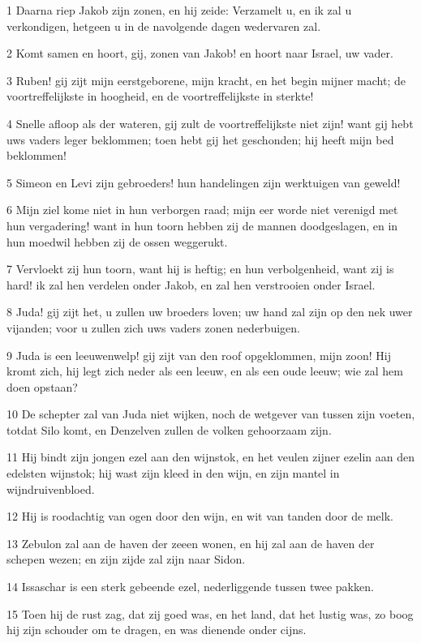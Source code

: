 \par 1 Daarna riep Jakob zijn zonen, en hij zeide: Verzamelt u, en ik zal u verkondigen, hetgeen u in de navolgende dagen wedervaren zal.
\par 2 Komt samen en hoort, gij, zonen van Jakob! en hoort naar Israel, uw vader.
\par 3 Ruben! gij zijt mijn eerstgeborene, mijn kracht, en het begin mijner macht; de voortreffelijkste in hoogheid, en de voortreffelijkste in sterkte!
\par 4 Snelle afloop als der wateren, gij zult de voortreffelijkste niet zijn! want gij hebt uws vaders leger beklommen; toen hebt gij het geschonden; hij heeft mijn bed beklommen!
\par 5 Simeon en Levi zijn gebroeders! hun handelingen zijn werktuigen van geweld!
\par 6 Mijn ziel kome niet in hun verborgen raad; mijn eer worde niet verenigd met hun vergadering! want in hun toorn hebben zij de mannen doodgeslagen, en in hun moedwil hebben zij de ossen weggerukt.
\par 7 Vervloekt zij hun toorn, want hij is heftig; en hun verbolgenheid, want zij is hard! ik zal hen verdelen onder Jakob, en zal hen verstrooien onder Israel.
\par 8 Juda! gij zijt het, u zullen uw broeders loven; uw hand zal zijn op den nek uwer vijanden; voor u zullen zich uws vaders zonen nederbuigen.
\par 9 Juda is een leeuwenwelp! gij zijt van den roof opgeklommen, mijn zoon! Hij kromt zich, hij legt zich neder als een leeuw, en als een oude leeuw; wie zal hem doen opstaan?
\par 10 De schepter zal van Juda niet wijken, noch de wetgever van tussen zijn voeten, totdat Silo komt, en Denzelven zullen de volken gehoorzaam zijn.
\par 11 Hij bindt zijn jongen ezel aan den wijnstok, en het veulen zijner ezelin aan den edelsten wijnstok; hij wast zijn kleed in den wijn, en zijn mantel in wijndruivenbloed.
\par 12 Hij is roodachtig van ogen door den wijn, en wit van tanden door de melk.
\par 13 Zebulon zal aan de haven der zeeen wonen, en hij zal aan de haven der schepen wezen; en zijn zijde zal zijn naar Sidon.
\par 14 Issaschar is een sterk gebeende ezel, nederliggende tussen twee pakken.
\par 15 Toen hij de rust zag, dat zij goed was, en het land, dat het lustig was, zo boog hij zijn schouder om te dragen, en was dienende onder cijns.
